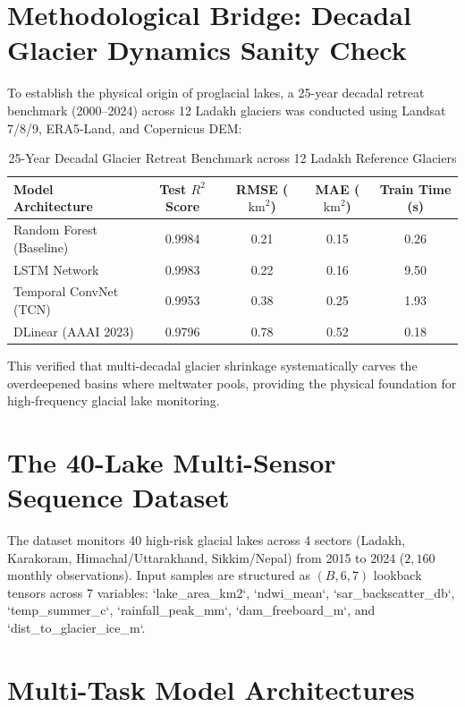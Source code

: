 \documentclass[12pt,a4paper]{report}
\begin{document}
\section{Methodological Bridge: Decadal Glacier Dynamics Sanity Check}
To establish the physical origin of proglacial lakes, a 25-year decadal retreat benchmark (2000--2024) across 12 Ladakh glaciers was conducted using Landsat 7/8/9, ERA5-Land, and Copernicus DEM:
\begin{table}[H]
\centering
\caption{25-Year Decadal Glacier Retreat Benchmark across 12 Ladakh Reference Glaciers}
\label{tab:glacier_retreat_bridge}
\begin{tabular}{lcccc}
\toprule
\textbf{Model Architecture} & \textbf{Test $R^2$ Score} & \textbf{RMSE ($\text{km}^2$)} & \textbf{MAE ($\text{km}^2$)} & \textbf{Train Time (s)} \\
\midrule
Random Forest (Baseline) & 0.9984 & 0.21 & 0.15 & 0.26 \\
LSTM Network & 0.9983 & 0.22 & 0.16 & 9.50 \\
Temporal ConvNet (TCN) & 0.9953 & 0.38 & 0.25 & 1.93 \\
DLinear (AAAI 2023) & 0.9796 & 0.78 & 0.52 & 0.18 \\
\bottomrule
\end{tabular}
\end{table}
This verified that multi-decadal glacier shrinkage systematically carves the overdeepened basins where meltwater pools, providing the physical foundation for high-frequency glacial lake monitoring.

\section{The 40-Lake Multi-Sensor Sequence Dataset}
The dataset monitors 40 high-risk glacial lakes across 4 sectors (Ladakh, Karakoram, Himachal/Uttarakhand, Sikkim/Nepal) from 2015 to 2024 ($2,160$ monthly observations). Input samples are structured as $(B, 6, 7)$ lookback tensors across 7 variables: `lake_area_km2`, `ndwi_mean`, `sar_backscatter_db`, `temp_summer_c`, `rainfall_peak_mm`, `dam_freeboard_m`, and `dist_to_glacier_ice_m`.

\section{Multi-Task Model Architectures}
\end{document}
